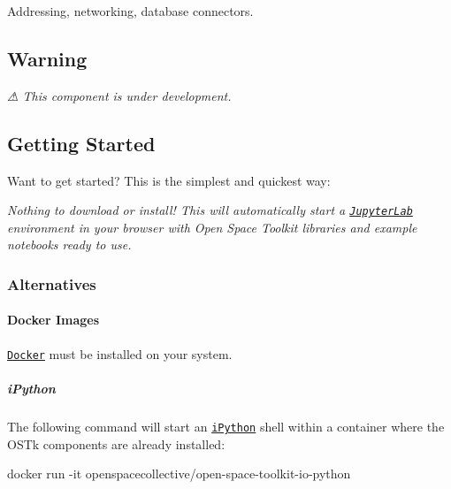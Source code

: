 \href{https://travis-ci.com/open-space-collective/open-space-toolkit-io}{\tt } \href{https://codecov.io/gh/open-space-collective/open-space-toolkit-io}{\tt } \href{https://open-space-collective.github.io/open-space-toolkit-io}{\tt } \href{https://badge.fury.io/gh/open-space-collective%2Fopen-space-toolkit-io}{\tt } \href{https://badge.fury.io/py/open-space-toolkit-io}{\tt } \href{https://opensource.org/licenses/Apache-2.0}{\tt }

Addressing, networking, database connectors.

\subsection*{Warning}

{\itshape ⚠ This component is under development.}

\subsection*{Getting Started}

Want to get started? This is the simplest and quickest way\+:

\href{https://mybinder.org/v2/gh/open-space-collective/open-space-toolkit/master?urlpath=lab/tree/notebooks}{\tt }

{\itshape Nothing to download or install! This will automatically start a \href{https://jupyterlab.readthedocs.io/en/stable/}{\tt Jupyter\+Lab} environment in your browser with Open Space Toolkit libraries and example notebooks ready to use.}

\subsubsection*{Alternatives}

\paragraph*{Docker Images}

\href{https://www.docker.com/}{\tt Docker} must be installed on your system.

\subparagraph*{i\+Python}

The following command will start an \href{https://ipython.org/}{\tt i\+Python} shell within a container where the O\+S\+Tk components are already installed\+:


\begin{DoxyCode}
docker run -it openspacecollective/open-space-toolkit-io-python
\end{DoxyCode}



